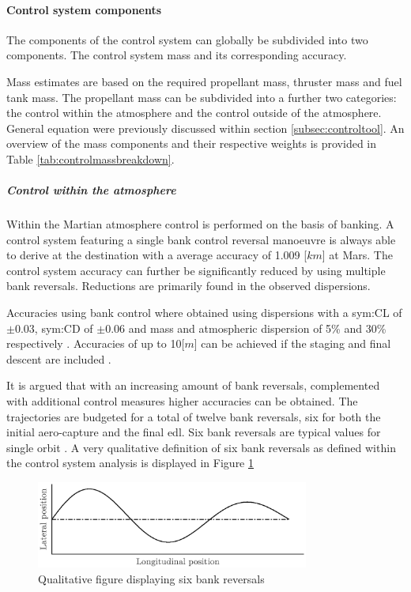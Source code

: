 \paragraph{Control system components}

The components of the control system can  globally be subdivided into two components. The control system mass and its corresponding accuracy.

Mass estimates are based on the required propellant mass, thruster mass and fuel tank mass. The propellant mass can be subdivided into a further two categories: the control within the atmosphere and the control outside of the atmosphere. General equation were previously discussed within section \ref{subsec:controltool}. An overview of the mass components and their respective weights is provided in Table \ref{tab:controlmassbreakdown}.

\subparagraph{Control within the atmosphere} 

Within the Martian atmosphere control is performed on the basis of banking. A control system featuring a single bank control reversal manoeuvre is always able to derive at the destination with a average accuracy of 1.009 [$km$] at Mars\cite{Lu2007}. The control system accuracy can further be significantly reduced by using multiple bank reversals. Reductions are primarily found in the observed dispersions.

Accuracies using bank control where obtained using dispersions with a \gls{sym:CL} of $\pm 0.03 $, \gls{sym:CD}  of $\pm 0.06 $ and mass and atmospheric dispersion of 5\% and 30\% respectively \cite{Lu2007}. Accuracies of up to 10[$m$] can be achieved if the staging and final descent are included \cite{Davis2010}. 

It is argued that with an increasing amount of bank reversals, complemented with additional control measures higher accuracies can be obtained. The trajectories are budgeted for a total of twelve bank reversals, six for both the initial aero-capture and the final \gls{edl}. Six bank reversals are typical values for single orbit \cite{Lu2007, Cianciolo2010}. A very qualitative definition of six bank reversals as defined within the control system analysis is displayed in Figure \ref{fig:bankdef}

\begin{figure}[h]
	\centering
	\includegraphics[width=0.8\textwidth]{./Figure/control/bankdef.eps}
	\caption{Qualitative figure displaying six bank reversals}
	\label{fig:bankdef}
\end{figure}


